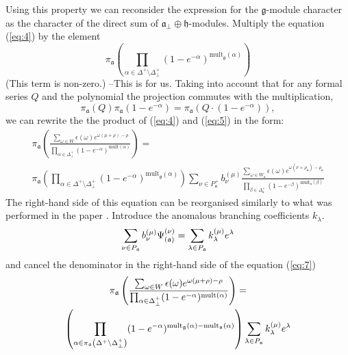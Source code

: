 \documentclass[a4paper,12pt]{article}
\theoremstyle{definition} \newtheorem{Def}{Definition}
\begin{document}
Using this property we can reconsider the expression for the $\mathfrak{g}$-module character as the character of the direct sum of $\mathfrak{a}_{\bot}\oplus\mathfrak{h}$-modules.
Multiply the equation (\ref{eq:4}) by the element
\begin{equation}
  \label{eq:5}
  \pi_{\mathfrak{a}}\left(\prod_{\alpha\in \Delta^{+}\setminus \Delta^{+}_{\bot}}(1-e^{-\alpha})^{\mathrm{mult}_{\mathfrak{g}}(\alpha)} \right)
\end{equation}
{\color{red}(This term is non-zero.) --This is for us.}
{\color{blue}Taking into account that for any formal series $Q$ and the polynomial the projection commutes with the multiplication,
\begin{equation}
  \label{eq:6}
  \pi_{\mathfrak{a}} (Q) \pi_{\mathfrak{a}}(1-e^{-\alpha})=\pi_{\mathfrak{a}}\left(Q\cdot (1-e^{-\alpha})\right),
\end{equation}
we can rewrite the 
the product of (\ref{eq:4}) and (\ref{eq:5}) in the form:}
\begin{multline}
  \label{eq:7}
  \pi_{\mathfrak{a}}\left(\frac{\sum_{\omega\in W} \epsilon(\omega) e^{\omega(\mu+\rho)-\rho}}{\prod_{\alpha\in\Delta^{+}_{\bot}}(1-e^{-\alpha})^{\mathrm{mult}(\alpha)}}\right) = \\
  \pi_{\mathfrak{a}}\left(\prod_{\alpha\in \Delta^{+}\setminus \Delta^{+}_{\bot}}(1-e^{-\alpha})^{\mathrm{mult}_{\mathfrak{g}}(\alpha)} \right)\sum_{\nu\in P^{+}_{\mathfrak{a}}}b^{(\mu)}_{\nu}
  \frac{\sum_{\omega\in W_{\mathfrak{a}}}\epsilon(\omega)e^{\omega(\nu+\rho_{\mathfrak{a}})-\rho_{\mathfrak{a}}}}{\prod_{\beta\in \Delta_{\mathfrak{a}}^{+}}(1-e^{-\beta})^{\mathrm{mult}_{\mathfrak{a}}(\beta)}}
\end{multline}
The right-hand side of this equation can be reorganised similarly to what was performed in the paper \cite{ilyin812pbc}. Introduce the anomalous branching coefficients $k_{\lambda}$.
\begin{equation}
  \label{eq:10}
  \sum_{\nu \in P_{\frak{a}}}b_{\nu }^{\left( \mu \right) }\Psi _{\left( \frak{%
        a}\right) }^{\left( \nu \right) }=\sum_{\lambda \in P_{\frak{a}}}k_{\lambda
  }^{\left( \mu \right) }e^{\lambda }
\end{equation}
and cancel the denominator in the right-hand side of the equation (\ref{eq:7})
\begin{multline}
  \label{eq:12}
  \pi_{\mathfrak{a}}\left(\frac{\sum_{\omega\in W} \epsilon(\omega) e^{\omega(\mu+\rho)-\rho}}{\prod_{\alpha\in\Delta^{+}_{\bot}}(1-e^{-\alpha})^{\mathrm{mult}(\alpha)}}\right) = \\
  \left(\prod_{\alpha\in \pi_{\mathfrak{a}}\left(\Delta^{+}\setminus \Delta^{+}_{\bot}\right)}(1-e^{-\alpha})^{{\rm mult}_{\mathfrak{g}}(\alpha)-{\rm mult}_{\mathfrak{a}}(\alpha)} \right)
    \sum_{\lambda \in P_{\frak{a}}}k_{\lambda}^{\left( \mu \right) }e^{\lambda }
\end{multline}
\end{document}
